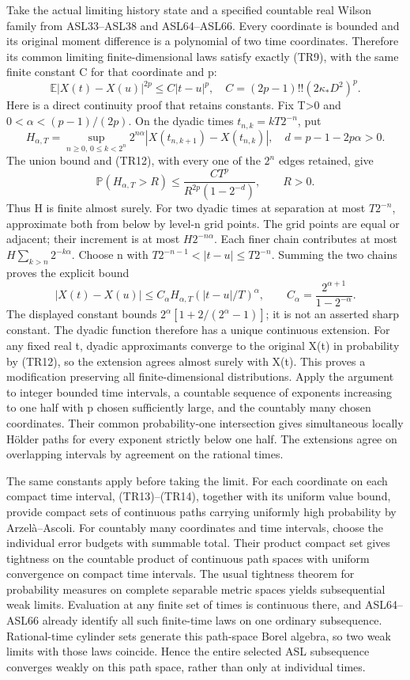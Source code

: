 \documentclass[11pt]{article}
\begin{document}
Take the actual limiting history state and a specified countable real Wilson family from ASL33–ASL38 and ASL64–ASL66. Every coordinate is bounded and its original moment difference is a polynomial of two time coordinates. Therefore its common limiting finite-dimensional laws satisfy exactly (TR9), with the same finite constant C for that coordinate and p:
\[
 \mathbb E|X(t)-X(u)|^{2p}\le C|t-u|^p,
 \quad C=(2p-1)!!(2\kappa_*D^2)^p.
 \tag{TR12}
\]
Here is a direct continuity proof that retains constants. Fix T>0 and \(0<\alpha<(p-1)/(2p)\). On the dyadic times \(t_{n,k}=kT2^{-n}\), put
\[
 H_{\alpha,T}=\sup_{n\ge0,\,0\le k<2^n}
  2^{n\alpha}|X(t_{n,k+1})-X(t_{n,k})|,\quad
 d=p-1-2p\alpha>0.
\]
The union bound and (TR12), with every one of the \(2^n\) edges retained, give
\[
 \mathbb P(H_{\alpha,T}>R)
 \le\frac{CT^p}{R^{2p}(1-2^{-d})},\qquad R>0.
 \tag{TR13}
\]
Thus H is finite almost surely. For two dyadic times at separation at most \(T2^{-n}\), approximate both from below by level-n grid points. The grid points are equal or adjacent; their increment is at most \(H2^{-n\alpha}\). Each finer chain contributes at most \(H\sum_{k>n}2^{-k\alpha}\). Choose n with \(T2^{-n-1}<|t-u|\le T2^{-n}\). Summing the two chains proves the explicit bound
\[
 |X(t)-X(u)|\le C_\alpha H_{\alpha,T}
       (|t-u|/T)^\alpha,\qquad
 C_\alpha=\frac{2^{\alpha+1}}{1-2^{-\alpha}}.
 \tag{TR14}
\]
The displayed constant bounds \(2^\alpha[1+2/(2^\alpha-1)]\); it is not an asserted sharp constant. The dyadic function therefore has a unique continuous extension. For any fixed real t, dyadic approximants converge to the original X(t) in probability by (TR12), so the extension agrees almost surely with X(t). This proves a modification preserving all finite-dimensional distributions. Apply the argument to integer bounded time intervals, a countable sequence of exponents increasing to one half with p chosen sufficiently large, and the countably many chosen coordinates. Their common probability-one intersection gives simultaneous locally Hölder paths for every exponent strictly below one half. The extensions agree on overlapping intervals by agreement on the rational times.

The same constants apply before taking the limit. For each coordinate on each compact time interval, (TR13)–(TR14), together with its uniform value bound, provide compact sets of continuous paths carrying uniformly high probability by Arzelà–Ascoli. For countably many coordinates and time intervals, choose the individual error budgets with summable total. Their product compact set gives tightness on the countable product of continuous path spaces with uniform convergence on compact time intervals. The usual tightness theorem for probability measures on complete separable metric spaces yields subsequential weak limits. Evaluation at any finite set of times is continuous there, and ASL64–ASL66 already identify all such finite-time laws on one ordinary subsequence. Rational-time cylinder sets generate this path-space Borel algebra, so two weak limits with those laws coincide. Hence the entire selected ASL subsequence converges weakly on this path space, rather than only at individual times.
\end{document}
